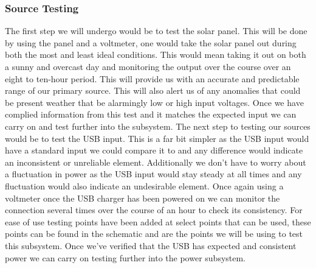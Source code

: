 \subsubsection{Source Testing}
The first step we will undergo would be to test the solar panel. This will be done by using the panel and a voltmeter, one would take the solar panel out during both the most and least ideal conditions. This would mean taking it out on both a sunny and overcast day and monitoring the output over the course over an eight to ten-hour period. This will provide us with an accurate and predictable range of our primary source. This will also alert us of any anomalies that could be present weather that be alarmingly low or high input voltages. Once we have complied information from this test and it matches the expected input we can carry on and test further into the subsystem.
The next step to testing our sources would be to test the USB input. This is a far bit simpler as the USB input would have a standard input we could compare it to and any difference would indicate an inconsistent or unreliable element. Additionally we don't have to worry about a fluctuation in power as the USB input would stay steady at all times and any fluctuation would also indicate an undesirable element. Once again using a voltmeter once the USB charger has been powered on we can monitor the connection several times over the course of an hour to check its consistency. For ease of use testing points have been added at select points that can be used, these points can be found in the schematic and are the points we will be using to test this subsystem. Once we've verified that the USB has expected and consistent power we can carry on testing further into the power subsystem.

